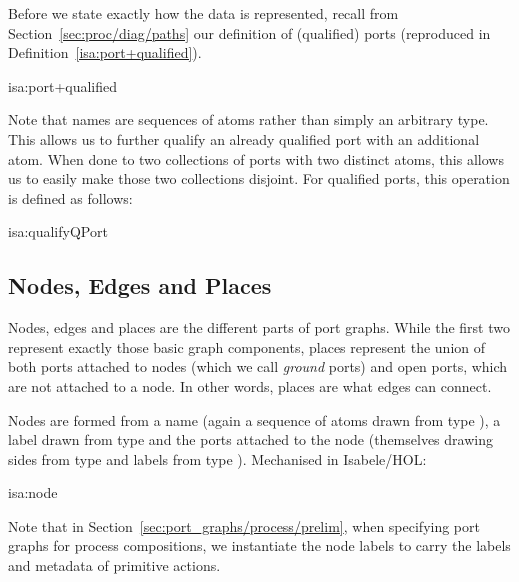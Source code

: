 \documentclass[class=smolathesis,crop=false]{standalone}
\begin{document}
Before we state exactly how the data is represented, recall from Section~\ref{sec:proc/diag/paths} our definition of (qualified) ports (reproduced in Definition~\ref{isa:port+qualified}).

\begin{isadef}{isa:port+qualified}
  
\item
  
\end{isadef}

Note that names are sequences of atoms rather than simply an arbitrary type.
This allows us to further qualify an already qualified port with an additional atom.
When done to two collections of ports with two distinct atoms, this allows us to easily make those two collections disjoint.
For qualified ports, this operation is defined as follows:
\begin{isadef}{isa:qualifyQPort}
  
\end{isadef}

\subsection{Nodes, Edges and Places}
\label{sec:port_graphs/mech/parts}

Nodes, edges and places are the different parts of port graphs.
While the first two represent exactly those basic graph components, places represent the union of both ports attached to nodes (which we call \emph{ground} ports) and open ports, which are not attached to a node.
In other words, places are what edges can connect.

Nodes are formed from a name (again a sequence of atoms drawn from type ), a label drawn from type  and the ports attached to the node (themselves drawing sides from type  and labels from type ).
Mechanised in Isabele/HOL:
\begin{isadef}{isa:node}
  
\end{isadef}
Note that in Section~\ref{sec:port_graphs/process/prelim}, when specifying port graphs for process compositions, we instantiate the node labels to carry the labels and metadata of primitive actions.
\end{document}
